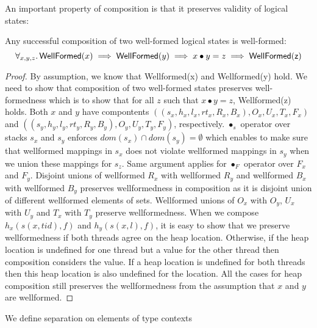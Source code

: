 An important property of composition is that it preserves validity of logical states:
\begin{lemma}
\label{lem:wf-compositionap}
Any successful composition of two well-formed logical states is well-formed:\[\forall_{x,y,z}\ldotp \mathsf{WellFormed}(x) \implies \mathsf{WellFormed}(y) \implies x\bullet y = z \implies \mathsf{WellFormed(z)}\]
\end{lemma}
\begin{proof}
By assumption, we know that \textsf{Wellformed}(x) and \textsf{Wellformed}(y) hold. We need to show that composition of two well-formed states preserves well-formedness which is to show that for all $z$ such that $x\bullet y = z$, \textsf{Wellformed}(z) holds.
  Both $x$ and $y$ have compontents $((s_x,h_x,l_x,rt_x,R_x,B_x),O_x,U_x,T_x,F_x)$ and $((s_y,h_y,l_y,rt_y,R_y,B_y),O_y,U_y,T_y,F_y)$, respectively. $\bullet_s$ operator over stacks $s_x$ and $s_y$ enforces $dom(s_x) \cap dom(s_y) = \emptyset$ which enables to make sure that wellformed mappings in $s_x$ does not violate wellformed mappings in $s_y$ when we union these mappings for $s_z$. Same argument applies for $\bullet_F$ operator over $F_x$ and $F_y$. Disjoint unions of wellformed $R_x$ with wellformed $R_y$ and wellformed $B_x$ with wellformed $B_y$ preserves wellformedness in composition as it is disjoint union of different wellformed elements of sets. Wellformed unions of $O_x$ with $O_y$,  $U_x$ with $U_y$  and $T_x$ with $T_y$ preserve wellformedness. When we compose $h_x(s(x,tid),f)$ and $h_y(s(x,l),f)$, it is easy to show that we preserve wellformedness if both threads agree on the heap location. Otherwise, if the heap location is undefined for one thread but a value for the other thread then composition considers the value. If a heap location is undefined for both threads then this heap location is also undefined for the location. All the cases for heap composition still preserves the wellformedness from the assumption that $x$ and $y$ are wellformed. 
  \end{proof}
We define separation on elements of type contexts
